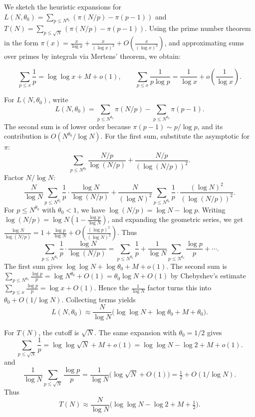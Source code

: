 \documentclass[11pt]{article}
\theoremstyle{definition}
\begin{document}
We sketch the heuristic expansions for
\(L(N,\theta_0) = \sum_{p \le N^{\theta_0}} (\pi(N/p) - \pi(p-1))\) and
\(T(N) = \sum_{p \le \sqrt{N}} (\pi(N/p) - \pi(p-1))\).  Using the prime number theorem
in the form \(\pi(x) = \frac{x}{\log x} + \frac{x}{(\log x)^2} + O\!\left(\frac{x}{(\log x)^3}\right)\),
and approximating sums over primes by integrals via Mertens' theorem, we obtain:

\[
\sum_{p \le x} \frac{1}{p} = \log\log x + M + o(1), \qquad
\sum_{p \le x} \frac{1}{p\log p} = \frac{1}{\log x} + o\!\left(\frac{1}{\log x}\right).
\]

For \(L(N,\theta_0)\), write
\[
L(N,\theta_0) = \sum_{p \le N^{\theta_0}} \pi(N/p) - \sum_{p \le N^{\theta_0}} \pi(p-1).
\]
The second sum is of lower order because \(\pi(p-1) \sim p/\log p\), and its contribution
is \(O(N^{\theta_0}/\log N)\).  For the first sum, substitute the asymptotic for \(\pi\):
\[
\sum_{p \le N^{\theta_0}} \frac{N/p}{\log(N/p)} + \frac{N/p}{(\log(N/p))^2}.
\]
Factor \(N/\log N\):
\[
\frac{N}{\log N} \sum_{p \le N^{\theta_0}} \frac{1}{p} \cdot \frac{\log N}{\log(N/p)} + \frac{N}{(\log N)^2} \sum_{p \le N^{\theta_0}} \frac{1}{p} \cdot \frac{(\log N)^2}{(\log(N/p))^2}.
\]
For \(p \le N^{\theta_0}\) with \(\theta_0 < 1\), we have \(\log(N/p) = \log N - \log p\).
Writing \(\log(N/p) = \log N (1 - \frac{\log p}{\log N})\), and expanding the geometric series,
we get \(\frac{\log N}{\log(N/p)} = 1 + \frac{\log p}{\log N} + O\!\left(\frac{(\log p)^2}{(\log N)^2}\right)\).
Thus
\[
\sum_{p \le N^{\theta_0}} \frac{1}{p} \cdot \frac{\log N}{\log(N/p)} = \sum_{p \le N^{\theta_0}} \frac{1}{p} + \frac{1}{\log N} \sum_{p \le N^{\theta_0}} \frac{\log p}{p} + \cdots.
\]
The first sum gives \(\log\log N + \log\theta_0 + M + o(1)\).  The second sum is
\(\sum_{p \le N^{\theta_0}} \frac{\log p}{p} = \log N^{\theta_0} + O(1) = \theta_0 \log N + O(1)\)
by Chebyshev's estimate \(\sum_{p \le x} \frac{\log p}{p} = \log x + O(1)\).  Hence the
\(\frac{1}{\log N}\) factor turns this into \(\theta_0 + O(1/\log N)\).  Collecting terms yields
\[
L(N,\theta_0) \approx \frac{N}{\log N} \bigl(\log\log N + \log\theta_0 + M + \theta_0\bigr).
\]

For \(T(N)\), the cutoff is \(\sqrt{N}\).  The same expansion with \(\theta_0 = 1/2\) gives
\[
\sum_{p \le \sqrt{N}} \frac{1}{p} = \log\log\sqrt{N} + M + o(1) = \log\log N - \log 2 + M + o(1).
\]
and
\[
\frac{1}{\log N} \sum_{p \le \sqrt{N}} \frac{\log p}{p} = \frac{1}{\log N} \bigl(\log\sqrt{N} + O(1)\bigr) = \tfrac{1}{2} + O(1/\log N).
\]
Thus
\[
T(N) \approx \frac{N}{\log N} \bigl(\log\log N - \log 2 + M + \tfrac{1}{2}\bigr).
\]
\end{document}
